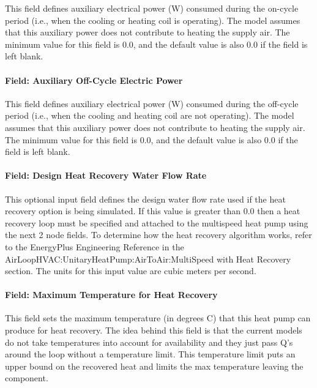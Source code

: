 This field defines auxiliary electrical power (W) consumed during the on-cycle period (i.e., when the cooling or heating coil is operating). The model assumes that this auxiliary power does not contribute to heating the supply air. The minimum value for this field is 0.0, and the default value is also 0.0 if the field is left blank.

\paragraph{Field: Auxiliary Off-Cycle Electric Power}\label{field-auxiliary-off-cycle-electric-power}

This field defines auxiliary electrical power (W) consumed during the off-cycle period (i.e., when the cooling and heating coil are not operating). The model assumes that this auxiliary power does not contribute to heating the supply air. The minimum value for this field is 0.0, and the default value is also 0.0 if the field is left blank.

\paragraph{Field: Design Heat Recovery Water Flow Rate}\label{field-design-heat-recovery-water-flow-rate-1-001}

This optional input field defines the design water flow rate used if the heat recovery option is being simulated. If this value is greater than 0.0 then a heat recovery loop must be specified and attached to the multispeed heat pump using the next 2 node fields. To determine how the heat recovery algorithm works, refer to the EnergyPlus Engineering Reference in the AirLoopHVAC:UnitaryHeatPump:AirToAir:MultiSpeed with Heat Recovery section. The units for this input value are cubic meters per second.

\paragraph{Field: Maximum Temperature for Heat Recovery}\label{field-maximum-temperature-for-heat-recovery-1}

This field sets the maximum temperature (in degrees C) that this heat pump can produce for heat recovery. The idea behind this field is that the current models do not take temperatures into account for availability and they just pass Q's around the loop without a temperature limit. This temperature limit puts an upper bound on the recovered heat and limits the max temperature leaving the component.

